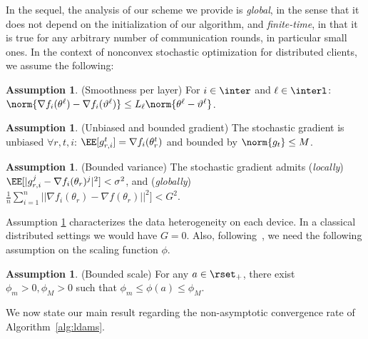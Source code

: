 \documentclass[nohyperref]{article}
\theoremstyle{plain}
\theoremstyle{definition}
\newtheorem{assumption}[theo]{Assumption}
\theoremstyle{remark}
\begin{document}
In the sequel, the analysis of our scheme we provide is \emph{global}, in the sense that it does not depend on the initialization of our algorithm, and \emph{finite-time}, in that it is true for any arbitrary number of communication rounds, in particular small ones.
In the  context of nonconvex stochastic optimization for distributed clients, we assume the following:
\begin{assumption}\label{ass:smooth}(Smoothness per layer)
For $i \in \inter$ and $\ell \in \interl$: $\norm{\nabla f_i (\theta^\ell) - \nabla f_i (\vartheta^\ell)} \leq L_\ell \norm{\theta^\ell-\vartheta^\ell}$.
\end{assumption}
\begin{assumption}\label{ass:boundgrad}(Unbiased and bounded gradient)
The stochastic gradient is unbiased $\forall r,t,i$: $\EE[g_{r,i}^t] = \nabla f_i(\theta_r^t)$ and bounded by $\norm{g_t} \leq M$.
\end{assumption}
\begin{assumption}\label{ass:var}(Bounded variance)
The stochastic gradient admits (\emph{locally}) $\EE[|g_{r,i}^j - \nabla f_i(\theta_r)^j|^2] < \sigma^2$, and (\emph{globally}) $ \frac{1}{n} \sum_{i=1}^n ||\nabla f_{i}(\theta_r) - \nabla f(\theta_r)||^2] < G^2$.
\end{assumption}
Assumption \ref{ass:var} characterizes the data heterogeneity on each device. In a classical distributed settings we would have $G = 0$.
Also, following~\citet{you2019large}, we need the following assumption on the scaling function $\phi$.
\begin{assumption}\label{ass:phi}(Bounded scale)
For any $a \in \rset_+$, there exist $\phi_m>0,\phi_M>0$ such that $\phi_m \leq  \phi(a) \leq \phi_M$.
\end{assumption}
We now state our main result regarding the non-asymptotic convergence rate of Algorithm~\ref{alg:ldams}. 
\medskip 
\end{document}
